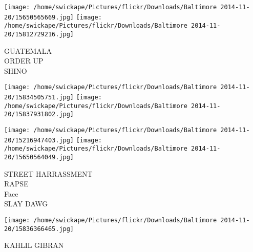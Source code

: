 \documentclass[10pt,letterpaper]{article}
\begin{document}
\vspace{0.25in}
\texttt{[image: /home/swickape/Pictures/flickr/Downloads/Baltimore 2014-11-20/15650565669.jpg]}
\texttt{[image: /home/swickape/Pictures/flickr/Downloads/Baltimore 2014-11-20/15812729216.jpg]}

GUATEMALA\\
ORDER UP\\
SHINO
\pagebreak

\texttt{[image: /home/swickape/Pictures/flickr/Downloads/Baltimore 2014-11-20/15834505751.jpg]}
\texttt{[image: /home/swickape/Pictures/flickr/Downloads/Baltimore 2014-11-20/15837931802.jpg]}

\texttt{[image: /home/swickape/Pictures/flickr/Downloads/Baltimore 2014-11-20/15216947403.jpg]}
\texttt{[image: /home/swickape/Pictures/flickr/Downloads/Baltimore 2014-11-20/15650564049.jpg]}

STREET HARRASSMENT\\
RAPSE\\
Face\\
SLAY DAWG
\pagebreak

\texttt{[image: /home/swickape/Pictures/flickr/Downloads/Baltimore 2014-11-20/15836366465.jpg]}

KAHLIL GIBRAN
\pagebreak
\end{document}
